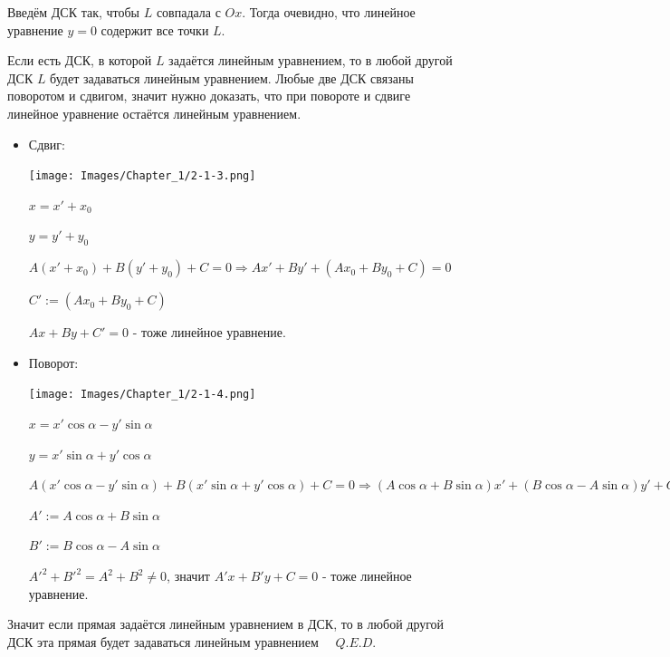 \begin{enumerate}
          Введём ДСК так, чтобы \(L\) совпадала с \(Ox\). Тогда очевидно, что линейное уравнение \(y = 0\) содержит все точки \(L\).

          Если есть ДСК, в которой \(L\) задаётся линейным уравнением, то в любой другой ДСК \(L\) будет задаваться линейным уравнением.
          Любые две ДСК связаны поворотом и сдвигом, значит нужно доказать, что при повороте и сдвиге линейное уравнение остаётся линейным уравнением.

          \begin{itemize}
              \item Сдвиг:
                    \begin{center}
                        \texttt{[image: Images/Chapter\_1/2-1-3.png]}
                    \end{center}
                    \(x = x' + x_0\)

                    \(y = y' + y_0\)

                    \(A(x' + x_0) + B(y' + y_0) + C = 0 \Rightarrow Ax' + By' + (Ax_0 + By_0 + C) = 0\)

                    \(C' := (Ax_0 + By_0 + C)\)

                    \(Ax + By + C' = 0\) - тоже линейное уравнение.
              \item Поворот:
                    \begin{center}
                        \texttt{[image: Images/Chapter\_1/2-1-4.png]}
                    \end{center}
                    \(x = x'\cos\alpha - y'\sin\alpha\)

                    \(y = x'\sin\alpha + y'\cos\alpha\)

                    \(A(x'\cos\alpha - y'\sin\alpha) + B(x'\sin\alpha + y'\cos\alpha) + C = 0 \Rightarrow (A\cos\alpha + B\sin\alpha)x' + (B\cos\alpha - A\sin\alpha)y' + C = 0\)

                    \(A' := A\cos\alpha + B\sin\alpha\)

                    \(B' := B\cos\alpha - A\sin\alpha\)

                    \(A'^2 + B'^2 = A^2 + B^2 \neq 0\), значит \(A'x + B'y + C = 0\) - тоже линейное уравнение.
          \end{itemize}
          Значит если прямая задаётся линейным уравнением в ДСК, то в любой другой ДСК эта прямая будет задаваться линейным уравнением \(\quad Q.E.D.\)
\end{enumerate}

